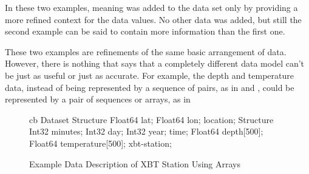 %
%

In these two examples, meaning was added to the data set only by
providing a more refined context for the data values. No other data
was added, but still the second example can be said to contain more
information than the first one.

These two examples are refinements of the same basic arrangement of
data. However, there is nothing that says that a completely different
data model can't be just as useful or just as accurate. For example,
the depth and temperature data, instead of being represented by a
sequence of pairs, as in  and
, could be represented by a pair of
sequences or arrays, as in 

\begin{figure}[htbp]
\begin{vcode}{cb}
Dataset {
   Structure {
      Float64 lat;
      Float64 lon;
   } location;
   Structure {
      Int32 minutes;
      Int32 day;
      Int32 year;
   } time;
   Float64 depth[500];
   Float64 temperature[500];
} xbt-station;
\end{vcode}
\caption{Example Data Description of XBT Station Using Arrays}
\label{fig,data,XBT-DDS-array}
\end{figure}


